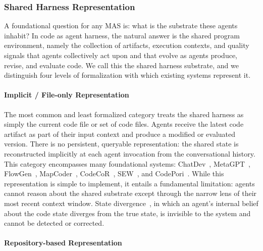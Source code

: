 \documentclass{llmxive}
\begin{document}
\subsubsection{Shared Harness Representation}

A foundational question for any MAS is: what is the substrate
these agents inhabit? In code as agent harness, the natural
answer is the shared program environment, namely the collection
of artifacts, execution contexts, and quality signals that agents
collectively act upon and that evolve as agents produce, revise,
and evaluate code. We call this the shared harness substrate, and
we distinguish four levels of formalization with which existing
systems represent it.

\paragraph{Implicit / File-only Representation}

The most common and least formalized category treats the shared
harness as simply the current code file or set of code files.
Agents receive the latest code artifact as part of their input
context and produce a modified or evaluated version. There is no
persistent, queryable representation: the shared state is
reconstructed implicitly at each agent invocation from the
conversational history. This category encompasses many
foundational systems: ChatDev~\cite{Qian2023ChatDev},
MetaGPT~\cite{Hong2023MetaGPT}, FlowGen~\cite{Lin2025Soen101},
MapCoder~\cite{islam2024mapcoder},
CodeCoR~\cite{Pan2025CodeCoR}, SEW~\cite{Liu2025SEW}, and
CodePori~\cite{Rasheed2024Codepori}. While this representation is
simple to implement, it entails a fundamental limitation: agents
cannot reason about the shared substrate except through the
narrow lens of their most recent context window.
State divergence~\cite{Guo2025SyncMind}, in which an agent's
internal belief about the code state diverges from the true
state, is invisible to the system and cannot be detected or
corrected.

\paragraph{Repository-based Representation}
\end{document}
